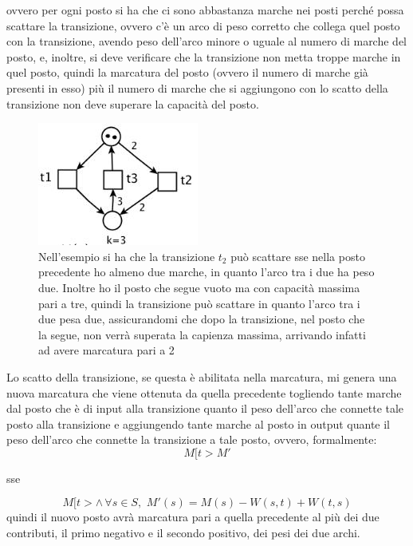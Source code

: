 \documentclass[a4paper,12pt, oneside]{book}
\begin{document}
\begin{definizione}
  ovvero per ogni posto si ha che ci sono abbastanza marche nei posti perché
  possa scattare la transizione, ovvero c'è un arco di peso corretto che collega
  quel posto con la transizione, avendo peso dell'arco minore o uguale al numero
  di marche del posto, e, inoltre, si deve verificare che la transizione non
  metta troppe marche in quel posto, quindi la marcatura del posto (ovvero il
  numero di marche già presenti in esso) più il numero di marche che si
  aggiungono con lo scatto della transizione non deve superare la capacità del
  posto.
  \begin{figure}[H]
    \centering
    \includegraphics[scale = 0.75]{img/pt21.jpg}
    \caption{Nell'esempio si ha che la transizione $t_2$ può scattare sse nella
      posto precedente ho almeno due marche, in quanto l'arco tra i due ha peso
      due. Inoltre ho il posto che segue vuoto ma con capacità massima pari a
      tre, quindi la transizione può scattare in quanto l'arco tra i due pesa
      due, assicurandomi che dopo la transizione, nel posto che la segue, non
      verrà superata la capienza massima, arrivando infatti ad avere marcatura
      pari a 2}
  \end{figure}
  Lo scatto della transizione, se questa è abilitata nella marcatura, mi genera
  una nuova marcatura che viene ottenuta da quella precedente togliendo tante
  marche dal posto che è di input alla transizione quanto il peso dell'arco che
  connette tale posto alla transizione e aggiungendo tante marche al posto in
  output quante il peso dell'arco che connette la transizione a tale posto,
  ovvero, formalmente: 
  \[M[t>M'\]
  \begin{center}
    sse
  \end{center}
  \[M[t> \wedge\, \forall s\in S,\,\,M'(s)=M(s)-W(s,t)+W(t,s)\]
  quindi il nuovo posto avrà marcatura pari a quella precedente al più dei due
  contributi, il primo negativo e il secondo positivo, dei pesi dei due archi.
\end{definizione}
\end{document}

